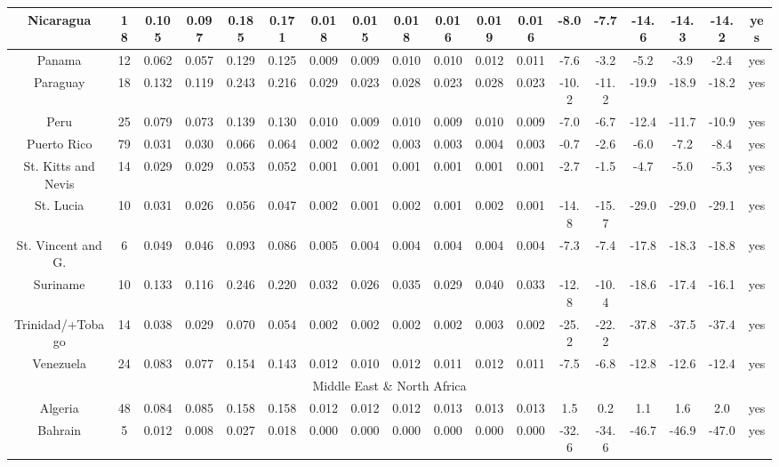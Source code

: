 \documentclass[10pt]{article}
\begin{document}
\begin{center}
\begin{tabular}{|c|c|c|c|c|c|c|c|c|c|c|c|c|c|c|c|c|c|}
\hline
Nicaragua & 18 & 0.105 & 0.097 & 0.185 & 0.171 & 0.018 & 0.015 & 0.018 & 0.016 & 0.019 & 0.016 & -8.0 & -7.7 & -14.6 & -14.3 & -14.2 & yes \\
\hline
Panama & 12 & 0.062 & 0.057 & 0.129 & 0.125 & 0.009 & 0.009 & 0.010 & 0.010 & 0.012 & 0.011 & -7.6 & -3.2 & -5.2 & -3.9 & -2.4 & yes \\
\hline
Paraguay & 18 & 0.132 & 0.119 & 0.243 & 0.216 & 0.029 & 0.023 & 0.028 & 0.023 & 0.028 & 0.023 & -10.2 & -11.2 & -19.9 & -18.9 & -18.2 & yes \\
\hline
Peru & 25 & 0.079 & 0.073 & 0.139 & 0.130 & 0.010 & 0.009 & 0.010 & 0.009 & 0.010 & 0.009 & -7.0 & -6.7 & -12.4 & -11.7 & -10.9 & yes \\
\hline
Puerto Rico & 79 & 0.031 & 0.030 & 0.066 & 0.064 & 0.002 & 0.002 & 0.003 & 0.003 & 0.004 & 0.003 & -0.7 & -2.6 & -6.0 & -7.2 & -8.4 & yes \\
\hline
St. Kitts and Nevis & 14 & 0.029 & 0.029 & 0.053 & 0.052 & 0.001 & 0.001 & 0.001 & 0.001 & 0.001 & 0.001 & -2.7 & -1.5 & -4.7 & -5.0 & -5.3 & yes \\
\hline
St. Lucia & 10 & 0.031 & 0.026 & 0.056 & 0.047 & 0.002 & 0.001 & 0.002 & 0.001 & 0.002 & 0.001 & -14.8 & -15.7 & -29.0 & -29.0 & -29.1 & yes \\
\hline
St. Vincent and G. & 6 & 0.049 & 0.046 & 0.093 & 0.086 & 0.005 & 0.004 & 0.004 & 0.004 & 0.004 & 0.004 & -7.3 & -7.4 & -17.8 & -18.3 & -18.8 & yes \\
\hline
Suriname & 10 & 0.133 & 0.116 & 0.246 & 0.220 & 0.032 & 0.026 & 0.035 & 0.029 & 0.040 & 0.033 & -12.8 & -10.4 & -18.6 & -17.4 & -16.1 & yes \\
\hline
Trinidad/+Tobago & 14 & 0.038 & 0.029 & 0.070 & 0.054 & 0.002 & 0.002 & 0.002 & 0.002 & 0.003 & 0.002 & -25.2 & -22.2 & -37.8 & -37.5 & -37.4 & yes \\
\hline
Venezuela & 24 & 0.083 & 0.077 & 0.154 & 0.143 & 0.012 & 0.010 & 0.012 & 0.011 & 0.012 & 0.011 & -7.5 & -6.8 & -12.8 & -12.6 & -12.4 & yes \\
\hline
\multicolumn{18}{|c|}{Middle East \& North Africa} \\
\hline
Algeria & 48 & 0.084 & 0.085 & 0.158 & 0.158 & 0.012 & 0.012 & 0.012 & 0.013 & 0.013 & 0.013 & 1.5 & 0.2 & 1.1 & 1.6 & 2.0 & yes \\
\hline
Bahrain & 5 & 0.012 & 0.008 & 0.027 & 0.018 & 0.000 & 0.000 & 0.000 & 0.000 & 0.000 & 0.000 & -32.6 & -34.6 & -46.7 & -46.9 & -47.0 & yes \\

\end{tabular}
\end{center}
\end{document}
